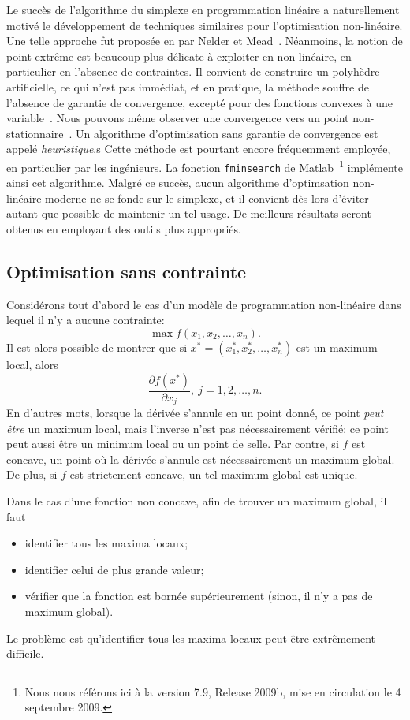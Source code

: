 Le succès de l'algorithme du simplexe en programmation linéaire a naturellement motivé le développement de techniques similaires pour l'optimisation non-linéaire.
Une telle approche fut proposée en par Nelder et Mead~\cite{NeldMead65}.
Néanmoins, la notion de point extrême est beaucoup plus délicate à exploiter en non-linéaire, en particulier en l'absence de contraintes.
Il convient de construire un polyhèdre artificielle, ce qui n'est pas immédiat, et en pratique, la méthode souffre de l'absence de garantie de convergence, excepté pour des fonctions convexes à une variable~\citep{LagaReedWrigWrig98}.
Nous pouvons même observer une convergence vers un point non-stationnaire~\cite{McKi98}.
Un algorithme d'optimisation sans garantie de convergence est appelé {\sl heuristique}.s
Cette méthode est pourtant encore fréquemment employée, en particulier par les ingénieurs.
La fonction \verb|fminsearch| de Matlab~\footnote{Nous nous référons ici à la version 7.9, Release 2009b, mise en circulation le 4 septembre 2009.} implémente ainsi cet algorithme.
Malgré ce succès, aucun algorithme d'optimsation non-linéaire moderne ne se fonde sur le simplexe, et il convient dès lors d'éviter autant que possible de maintenir un tel usage.
De meilleurs résultats seront obtenus en employant des outils plus appropriés.

\subsection{Optimisation sans contrainte}

Considérons tout d'abord le cas d'un modèle de programmation non-linéaire dans lequel il n'y a aucune contrainte:
\[
\max f(x_1,x_2,\ldots,x_n).
\]
Il est alors possible de montrer que si $x^* = (x_1^*,x_2^*,\ldots,x_n^*)$ est un maximum local, alors
\[
\frac{\partial f(x^*)}{\partial x_j},\ j = 1,2,\ldots,n.
\]
En d'autres mots, lorsque la dérivée s'annule en un point donné, ce point {\sl peut être} un maximum local, mais l'inverse n'est pas nécessairement vérifié: ce point peut aussi être un minimum local ou un point de selle.
Par contre, si $f$ est concave, un point où la dérivée s'annule est nécessairement un maximum global.
De plus, si $f$ est strictement concave, un tel maximum global est unique.

Dans le cas d'une fonction non concave, afin de trouver un maximum global, il faut
\begin{itemize}
	\item
	identifier tous les maxima locaux;
	\item
	identifier celui de plus grande valeur;
	\item
	vérifier que la fonction est bornée supérieurement (sinon, il n'y a pas de maximum global). 
\end{itemize}
Le problème est qu'identifier tous les maxima locaux peut être extrêmement difficile.


